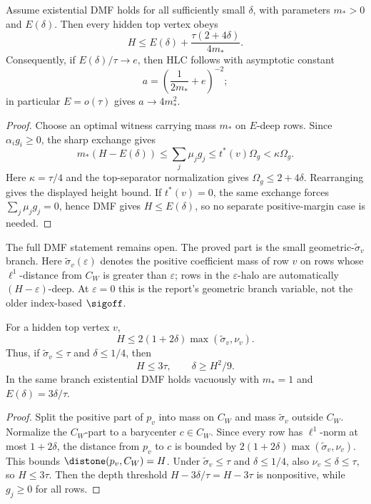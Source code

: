 \begin{proposition}
\modauditbadge
Assume existential DMF holds for all sufficiently small \(\delta\), with
parameters \(m_*>0\) and \(E(\delta)\).  Then every hidden top vertex obeys
\[
  H\le E(\delta)+\frac{\tau(2+4\delta)}{4m_*}.
\]
Consequently, if \(E(\delta)/\tau\to e\), then HLC follows with asymptotic
constant
\[
  a=\left(\frac{1}{2m_*}+e\right)^{-2};
\]
in particular \(E=o(\tau)\) gives \(a\to4m_*^2\).
\end{proposition}

\begin{proof}
Choose an optimal witness carrying mass \(m_*\) on \(E\)-deep rows.  Since
\(\alpha_i g_i\ge0\), the sharp exchange gives
\[
  m_*(H-E(\delta))
  \le \sum_j\mu_jg_j
  \le t^*(v)\Omega_g<\kappa\Omega_g .
\]
Here \(\kappa=\tau/4\) and the top-separator normalization gives
\(\Omega_g\le2+4\delta\).  Rearranging gives the displayed height bound.  If
\(t^*(v)=0\), the same exchange forces \(\sum_j\mu_jg_j=0\), hence DMF gives
\(H\le E(\delta)\), so no separate positive-margin case is needed.
\end{proof}

The full DMF statement remains open.  The proved part is the small
geometric-\(\widetilde\sigma_v\) branch.  Here
\(\widetilde\sigma_v(\varepsilon)\) denotes the positive coefficient mass
of row \(v\) on rows whose \(\ell^1\)-distance from \(C_W\) is greater than
\(\varepsilon\); rows in the \(\varepsilon\)-halo are automatically
\((H-\varepsilon)\)-deep.  At \(\varepsilon=0\) this is the report's
geometric branch variable, not the older index-based \(\sigoff\).

\begin{lemma}
\provedbadge
For a hidden top vertex \(v\),
\[
  H\le 2(1+2\delta)\max(\widetilde\sigma_v,\nu_v).
\]
Thus, if \(\widetilde\sigma_v\le\tau\) and \(\delta\le1/4\), then
\[
  H\le3\tau,\qquad \delta\ge H^2/9.
\]
In the same branch existential DMF holds vacuously with \(m_*=1\) and
\(E(\delta)=3\delta/\tau\).
\end{lemma}

\begin{proof}
Split the positive part of \(p_v\) into mass on \(C_W\) and mass
\(\widetilde\sigma_v\) outside \(C_W\).  Normalize the \(C_W\)-part to a
barycenter \(c\in C_W\).  Since every row has \(\ell^1\)-norm at most
\(1+2\delta\), the distance from \(p_v\) to \(c\) is bounded by
\(2(1+2\delta)\max(\widetilde\sigma_v,\nu_v)\).  This bounds
\(\distone(p_v,C_W)=H\).  Under \(\widetilde\sigma_v\le\tau\) and
\(\delta\le1/4\), also \(\nu_v\le\delta\le\tau\), so \(H\le3\tau\).  Then
the depth threshold \(H-3\delta/\tau=H-3\tau\) is nonpositive, while
\(g_j\ge0\) for all rows.
\end{proof}

